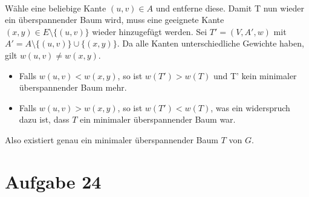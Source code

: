 \documentclass[10pt,a4paper]{article}
\begin{document}
\paragraph{}
Wähle eine beliebige Kante $(u, v) \in A$ und entferne diese. Damit T nun wieder ein überspannender Baum wird, muss eine geeignete Kante $(x, y) \in E \setminus \{(u,v)\}$ wieder hinzugefügt werden.
Sei $T' = (V, A', w)$ mit $A' = A \setminus \{(u,v)\} \cup \{(x,y)\}$.
Da alle Kanten unterschiedliche Gewichte haben, gilt $w(u,v) \neq w(x, y)$.
\begin{itemize}
	\item Falls $w(u, v) < w(x, y)$, so ist $w(T') > w(T)$ und T' kein minimaler überspannender Baum mehr.
	\item Falls $w(u, v) > w(x, y)$, so ist $w(T') < w(T)$, was ein widerspruch dazu ist, dass $T$ ein minimaler überspannender Baum war.
\end{itemize}

Also existiert genau ein minimaler überspannender Baum $T$ von $G$.

\section*{Aufgabe 24}
\end{document}
